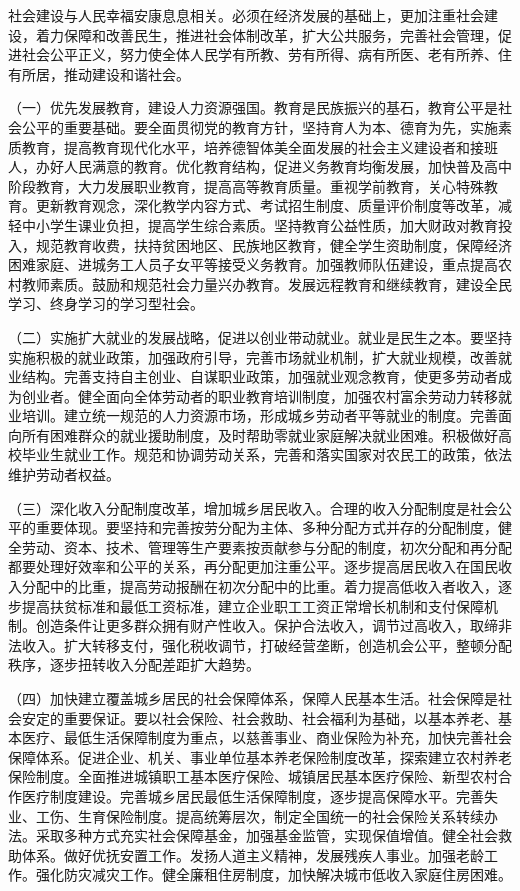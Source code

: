 社会建设与人民幸福安康息息相关。必须在经济发展的基础上，更加注重社会建设，着力保障和改善民生，推进社会体制改革，扩大公共服务，完善社会管理，促进社会公平正义，努力使全体人民学有所教、劳有所得、病有所医、老有所养、住有所居，推动建设和谐社会。

（一）优先发展教育，建设人力资源强国。教育是民族振兴的基石，教育公平是社会公平的重要基础。要全面贯彻党的教育方针，坚持育人为本、德育为先，实施素质教育，提高教育现代化水平，培养德智体美全面发展的社会主义建设者和接班人，办好人民满意的教育。优化教育结构，促进义务教育均衡发展，加快普及高中阶段教育，大力发展职业教育，提高高等教育质量。重视学前教育，关心特殊教育。更新教育观念，深化教学内容方式、考试招生制度、质量评价制度等改革，减轻中小学生课业负担，提高学生综合素质。坚持教育公益性质，加大财政对教育投入，规范教育收费，扶持贫困地区、民族地区教育，健全学生资助制度，保障经济困难家庭、进城务工人员子女平等接受义务教育。加强教师队伍建设，重点提高农村教师素质。鼓励和规范社会力量兴办教育。发展远程教育和继续教育，建设全民学习、终身学习的学习型社会。

（二）实施扩大就业的发展战略，促进以创业带动就业。就业是民生之本。要坚持实施积极的就业政策，加强政府引导，完善市场就业机制，扩大就业规模，改善就业结构。完善支持自主创业、自谋职业政策，加强就业观念教育，使更多劳动者成为创业者。健全面向全体劳动者的职业教育培训制度，加强农村富余劳动力转移就业培训。建立统一规范的人力资源市场，形成城乡劳动者平等就业的制度。完善面向所有困难群众的就业援助制度，及时帮助零就业家庭解决就业困难。积极做好高校毕业生就业工作。规范和协调劳动关系，完善和落实国家对农民工的政策，依法维护劳动者权益。

（三）深化收入分配制度改革，增加城乡居民收入。合理的收入分配制度是社会公平的重要体现。要坚持和完善按劳分配为主体、多种分配方式并存的分配制度，健全劳动、资本、技术、管理等生产要素按贡献参与分配的制度，初次分配和再分配都要处理好效率和公平的关系，再分配更加注重公平。逐步提高居民收入在国民收入分配中的比重，提高劳动报酬在初次分配中的比重。着力提高低收入者收入，逐步提高扶贫标准和最低工资标准，建立企业职工工资正常增长机制和支付保障机制。创造条件让更多群众拥有财产性收入。保护合法收入，调节过高收入，取缔非法收入。扩大转移支付，强化税收调节，打破经营垄断，创造机会公平，整顿分配秩序，逐步扭转收入分配差距扩大趋势。

（四）加快建立覆盖城乡居民的社会保障体系，保障人民基本生活。社会保障是社会安定的重要保证。要以社会保险、社会救助、社会福利为基础，以基本养老、基本医疗、最低生活保障制度为重点，以慈善事业、商业保险为补充，加快完善社会保障体系。促进企业、机关、事业单位基本养老保险制度改革，探索建立农村养老保险制度。全面推进城镇职工基本医疗保险、城镇居民基本医疗保险、新型农村合作医疗制度建设。完善城乡居民最低生活保障制度，逐步提高保障水平。完善失业、工伤、生育保险制度。提高统筹层次，制定全国统一的社会保险关系转续办法。采取多种方式充实社会保障基金，加强基金监管，实现保值增值。健全社会救助体系。做好优抚安置工作。发扬人道主义精神，发展残疾人事业。加强老龄工作。强化防灾减灾工作。健全廉租住房制度，加快解决城市低收入家庭住房困难。

